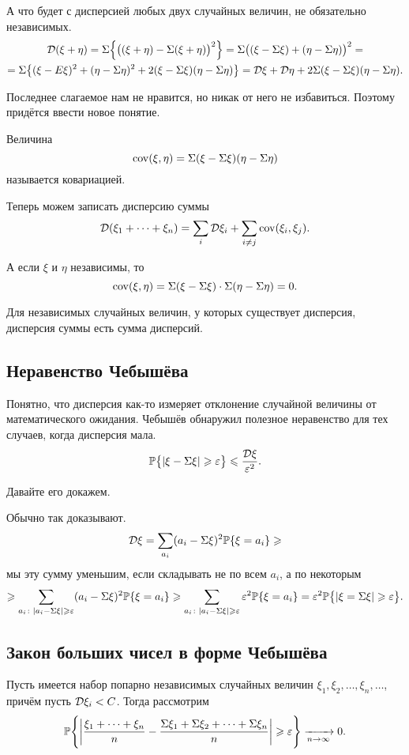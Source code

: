 А что будет с дисперсией любых двух случайных величин, не обязательно независимых.
\begin{multline*}
  \mathcal D(\xi + \eta) = \Sigma\Big\{\big((\xi+\eta) - \Sigma(\xi+\eta)\big)^2\Big\} = 
  \Sigma \big( (\xi - \Sigma\xi) + (\eta - \Sigma\eta)\big)^2 = \\=
  \Sigma \big\{(\xi-E\xi)^2 + (\eta - \Sigma\eta)^2 + 2(\xi - \Sigma\xi)(\eta - \Sigma\eta)\big\}=
  \mathcal D\xi + \mathcal D\eta +  2\Sigma(\xi-\Sigma\xi)(\eta - \Sigma\eta).
\end{multline*}

Последнее слагаемое нам не нравится, но никак от него не избавиться. Поэтому придётся ввести новое понятие.

\begin{Def}
  Величина
\[
  \operatorname{cov}(\xi,\eta) = \Sigma(\xi - \Sigma\xi)(\eta - \Sigma\eta)
\]
называется ковариацией.
\end{Def}

Теперь можем записать дисперсию суммы
\[
  \mathcal D(\xi_1+\dots+\xi_n) = \sum\limits_i \mathcal D\xi_i + \sum\limits_{i\ne j}\operatorname{cov}(\xi_i,\xi_j).
\]

А если $\xi$ и $\eta$ независимы, то
\[
  \operatorname{cov}(\xi,\eta) = \Sigma(\xi - \Sigma\xi)\cdot \Sigma(\eta - \Sigma\eta) = 0.
\]

Для независимых случайных величин, у которых существует дисперсия, дисперсия суммы есть сумма дисперсий.

\subsection{Неравенство Чебышёва}
Понятно, что дисперсия как-то измеряет отклонение случайной величины от математического ожидания. Чебышёв обнаружил полезное неравенство для тех случаев, когда дисперсия мала.
\[
  \mathbb P\big\{|\xi - \Sigma\xi|\geqslant \varepsilon\big\}\leqslant \frac{\mathcal D\xi}{\varepsilon^2}.
\]


Давайте его докажем.
\begin{Proof}
Обычно так доказывают.
\[
  \mathcal D\xi = \sum\limits_{a_i} (a_i - \Sigma\xi)^2 \mathbb P\{\xi = a_i\}\geqslant
\]
мы эту сумму уменьшим, если складывать не по всем $a_i$, а по некоторым
\[
  \geqslant \sum\limits_{a_i\colon |a_i - \Sigma\xi|\geqslant \varepsilon}(a_i - \Sigma\xi)^2\mathbb P\{\xi = a_i\}\geqslant 
  \sum\limits_{a_i\colon |a_i - \Sigma\xi|\geqslant \varepsilon} \varepsilon^2\mathbb P\{\xi = a_i\} = 
  \varepsilon^2 \mathbb P\big\{|\xi = \Sigma\xi|\geqslant \varepsilon\big\}.
\]
\end{Proof}

\subsection{Закон больших чисел в форме Чебышёва}
Пусть имеется набор попарно независимых случайных величин $\xi_1,\xi_2,\dots,\xi_n,\dots$, причём пусть $\mathcal D \xi_i<C$. Тогда рассмотрим
\[
  \mathbb P\Bigg\{\bigg|\frac{\xi_1 + \dots + \xi_n}{n} - \frac{\Sigma\xi_1 + \Sigma \xi_2+\dots + \Sigma\xi_n}{n}\bigg|\geqslant \varepsilon\Bigg\}\xrightarrow[n\rightarrow\infty]{} 0.
\]

